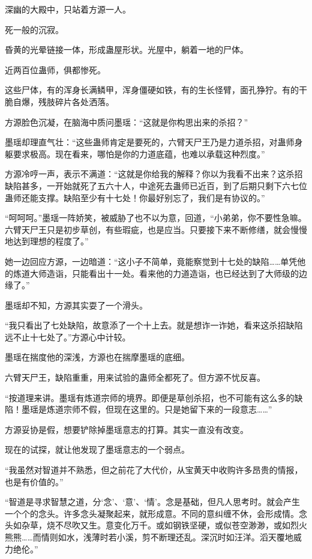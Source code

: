 
\begin{this_body}

深幽的大殿中，只站着方源一人。

死一般的沉寂。

昏黄的光晕链接一体，形成蛊屋形状。光屋中，躺着一地的尸体。

近两百位蛊师，俱都惨死。

这些尸体，有的浑身长满鳞甲，浑身僵硬如铁，有的生长怪臂，面孔狰狞。有的干脆自爆，残肢碎片各处洒落。

方源脸色沉凝，在脑海中质问墨瑶：“这就是你构思出来的杀招？”

墨瑶却理直气壮：“这些蛊师肯定是要死的，六臂天尸王乃是力道杀招，对蛊师身躯要求极高。现在看来，哪怕是你的力道底蕴，也难以承载这种烈度。”

方源冷哼一声，表示不满道：“这就是你给我的解释？你以为我看不出来？这杀招缺陷甚多，一开始就死了五六十人，中途死去蛊师已近百，到了后期只剩下六七位蛊师还能支撑。缺陷至少有十七处！你最好别忘了，我们是有协议的。”

“呵呵呵。”墨瑶一阵娇笑，被威胁了也不以为意，回道，“小弟弟，你不要性急嘛。六臂天尸王只是初步草创，有些瑕疵，也是应当。只要接下来不断修缮，就会慢慢地达到理想的程度了。”

她一边回应方源，一边暗道：“这小子不简单，竟能察觉到十七处的缺陷……单凭他的炼道大师造诣，只能看出十一处。看来他的力道造诣，也已经达到了大师级的边缘了。”

墨瑶却不知，方源其实耍了一个滑头。

“我只看出了七处缺陷，故意添了一个十上去。就是想诈一诈她，看来这杀招缺陷远不止十七处了。”方源心中计较。

墨瑶在揣度他的深浅，方源也在揣摩墨瑶的底细。

六臂天尸王，缺陷重重，用来试验的蛊师全都死了。但方源不忧反喜。

“按道理来讲。墨瑶有炼道宗师的境界。即便是草创杀招，也不可能有这么多的缺陷！墨瑶是炼道宗师不假，但现在这里的。只是她留下来的一段意志……”

方源妥协是假，想要铲除掉墨瑶意志的打算。其实一直没有改变。

现在的试探，就让他发现了墨瑶意志的一个弱点。

“我虽然对智道并不熟悉，但之前花了大代价，从宝黄天中收购许多昂贵的情报，也是有价值的。”

“智道是寻求智慧之道，分‘念’、‘意’、‘情’。念是基础，但凡人思考时。就会产生一个个的念头。许多念头凝聚起来，就形成意。不同的意纠缠不休，会形成情。念头如杂草，烧不尽吹又生。意变化万千。或如钢铁坚硬，或似苍空渺渺，或如烈火熊熊……而情则如水，浅薄时若小溪，剪不断理还乱。深沉时如汪洋。滔天覆地威力绝伦。”


\end{this_body}

